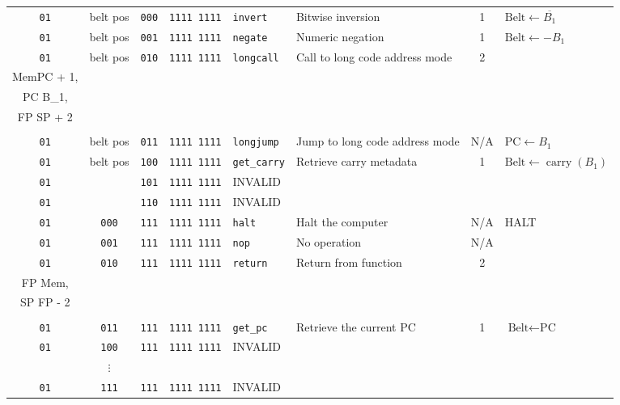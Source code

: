 \documentclass{article}
\begin{document}
\begin{landscape}
\begin{longtable}{c c c c l l c l}
		\texttt{01} & belt pos & \texttt{000} & \texttt{1111 1111} & \texttt{invert}     & Bitwise inversion              & 1   &
			\(\textrm{Belt} \gets \overline{B_1}\) \\
		\texttt{01} & belt pos & \texttt{001} & \texttt{1111 1111} & \texttt{negate}     & Numeric negation               & 1   &
			\(\textrm{Belt} \gets -B_1\) \\
		\texttt{01} & belt pos & \texttt{010} & \texttt{1111 1111} & \texttt{longcall}   & Call to long code address mode & 2 &
			\(\begin{array}{l}
				\textrm{Mem}\left[\textrm{SP}\right] \gets \textrm{FP}, \\
				\textrm{Mem}\left[\textrm{SP} + 1\right] \gets \textrm{PC} + 1, \\
				\textrm{PC} \gets B_1, \\
				\textrm{FP} \gets \textrm{SP} + 2 \\
			\end{array}\) \\
		\texttt{01} & belt pos & \texttt{011} & \texttt{1111 1111} & \texttt{longjump}   & Jump to long code address mode & N/A &
			\(\textrm{PC} \gets B_1\) \\
		\texttt{01} & belt pos & \texttt{100} & \texttt{1111 1111} & \texttt{get\_carry} & Retrieve carry metadata        & 1   &
			\(\textrm{Belt} \gets \operatorname{carry}\left(B_1\right)\) \\
		\texttt{01} & & \texttt{101} & \texttt{1111 1111} & INVALID & \\
		\texttt{01} & & \texttt{110} & \texttt{1111 1111} & INVALID & \\
		\texttt{01} & \texttt{000} & \texttt{111} & \texttt{1111 1111} & \texttt{halt}    & Halt the computer       & N/A & HALT \\
		\texttt{01} & \texttt{001} & \texttt{111} & \texttt{1111 1111} & \texttt{nop}     & No operation            & N/A & \\
		\texttt{01} & \texttt{010} & \texttt{111} & \texttt{1111 1111} & \texttt{return}  & Return from function    & 2 &
			\(\begin{array}{l}
				\textrm{PC} \gets \textrm{Mem}\left[\textrm{FP} - 1\right], \\
				\textrm{FP} \gets \textrm{Mem}\left[\textrm{FP} - 2\right], \\
				\textrm{SP} \gets \textrm{FP} - 2 \\
			\end{array}\) \\
		\texttt{01} & \texttt{011} & \texttt{111} & \texttt{1111 1111} & \texttt{get\_pc} & Retrieve the current PC & 1   &
			\(\textrm{Belt} \gets \textrm{PC}\) \\
		\texttt{01} & \texttt{100} & \texttt{111} & \texttt{1111 1111} & INVALID & \\
		            & \(\vdots\)   &              &                    &         & \\
		\texttt{01} & \texttt{111} & \texttt{111} & \texttt{1111 1111} & INVALID & \\


\end{longtable}
\end{landscape}
\end{document}
